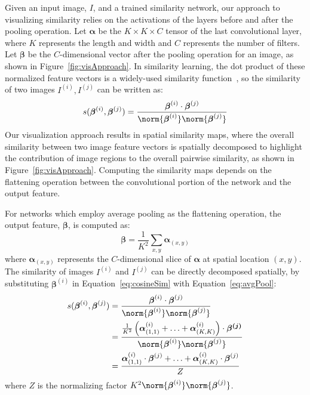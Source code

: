 \documentclass[12pt]{article}
\begin{document}
Given an input image, $I$, and a trained similarity network, our approach to visualizing similarity relies on the activations of the layers before and after the pooling operation. Let $\boldsymbol{\alpha}$ be the $K \times K \times C$ tensor of the last convolutional layer, where $K$ represents the length and width and $C$ represents the number of filters. Let $\boldsymbol{\beta}$ be the $C$-dimensional vector after the pooling operation for an image, as shown in Figure~\ref{fig:visApproach}. In similarity learning, the dot product of these normalized feature vectors is a widely-used similarity function~\cite{bell2015learning,Proxy,schroff2015facenet,sun2014deep,wang2014learning,yi2014deep}, so the similarity of two images $I^{(i)},I^{(j)}$ can be written as:
\begin{equation}
s(\boldsymbol{\beta}^{(i)},\boldsymbol{\beta}^{(j)}) = \frac{\boldsymbol{\beta}^{(i)} \cdot \boldsymbol{\beta}^{(j)}}{\norm{\boldsymbol{\beta}^{(i)}} \norm{\boldsymbol{\beta}^{(j)}}}
\label{eq:cosineSim}
\end{equation}
Our visualization approach results in spatial similarity maps, where the overall similarity between two image feature vectors is spatially decomposed to highlight the contribution of image regions to the overall pairwise similarity, as shown in Figure~\ref{fig:visApproach}. Computing the similarity maps depends on the flattening operation between the convolutional portion of the network and the output feature.

For networks which employ average pooling as the flattening operation, the output feature, $\boldsymbol{\beta}$, is computed as:
\begin{equation} 
\boldsymbol{\beta} = \frac{1}{K^2}\sum_{x,y} \boldsymbol{\alpha}_{(x,y)}
\label{eq:avgPool}
\end{equation}
\noindent where $\boldsymbol{\alpha}_{(x,y)}$ represents the $C$-dimensional slice of $\boldsymbol{\alpha}$  at spatial location $(x,y)$. The similarity of images $I^{(i)}$ and $I^{(j)}$ can be directly decomposed spatially, by substituting $\boldsymbol{\beta}^{(i)}$ in Equation~\ref{eq:cosineSim} with Equation~\ref{eq:avgPool}:
\begin{align}
    s(\boldsymbol{\beta}^{(i)},\boldsymbol{\beta}^{(j)}) &= \frac{\boldsymbol{\beta}^{(i)}\cdot\boldsymbol{\beta}^{(j)}}{\norm{\boldsymbol{\beta}^{(i)}} \norm{\boldsymbol{\beta}^{(j)}}}\nonumber\\
    &=
    \frac{\frac{1}{K^2}\left(\boldsymbol{\alpha}^{(i)}_{(1,1)} + \ldots + \boldsymbol{\alpha}^{(i)}_{(K,K)}\right)  \cdot \boldsymbol{\beta^{(j)}}}{\norm{\boldsymbol{\beta}^{(i)}} \norm{\boldsymbol{\beta}^{(j)}}}\nonumber\\
    &= \frac{\boldsymbol{\alpha}^{(i)}_{(1,1)} \cdot \boldsymbol{\beta}^{(j)} + \ldots + \boldsymbol{\alpha}^{(i)}_{(K,K)} \cdot \boldsymbol{\beta}^{(j)}
    }{Z}
\end{align}
\noindent where $Z$ is the normalizing factor $K^2 \norm{\boldsymbol{\beta}^{(i)}} \norm{\boldsymbol{\beta}^{(j)}}$.
\end{document}
